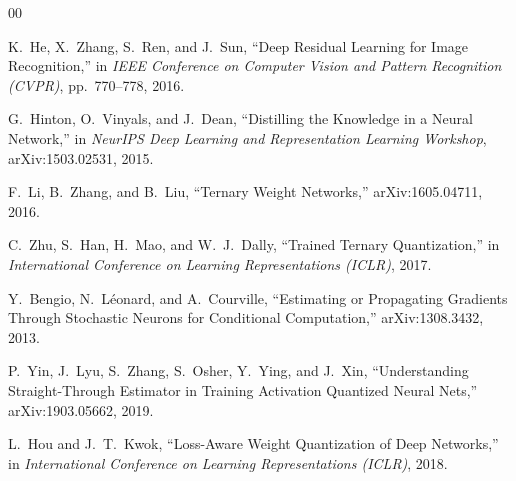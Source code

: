 \documentclass[conference]{IEEEtran}
\begin{document}

\begin{thebibliography}{00}

K.~He, X.~Zhang, S.~Ren, and J.~Sun,
``Deep Residual Learning for Image Recognition,''
in \textit{IEEE Conference on Computer Vision and Pattern Recognition (CVPR)},
pp.~770--778, 2016.

G.~Hinton, O.~Vinyals, and J.~Dean,
``Distilling the Knowledge in a Neural Network,''
in \textit{NeurIPS Deep Learning and Representation Learning Workshop},
arXiv:1503.02531, 2015.

F.~Li, B.~Zhang, and B.~Liu,
``Ternary Weight Networks,''
arXiv:1605.04711, 2016.

C.~Zhu, S.~Han, H.~Mao, and W.~J.~Dally,
``Trained Ternary Quantization,''
in \textit{International Conference on Learning Representations (ICLR)},
2017.

Y.~Bengio, N.~L{\'e}onard, and A.~Courville,
``Estimating or Propagating Gradients Through Stochastic Neurons for Conditional Computation,''
arXiv:1308.3432, 2013.

P.~Yin, J.~Lyu, S.~Zhang, S.~Osher, Y.~Ying, and J.~Xin,
``Understanding Straight-Through Estimator in Training Activation Quantized Neural Nets,''
arXiv:1903.05662, 2019.

L.~Hou and J.~T.~Kwok,
``Loss-Aware Weight Quantization of Deep Networks,''
in \textit{International Conference on Learning Representations (ICLR)},
2018.

\end{thebibliography}
\end{document}
